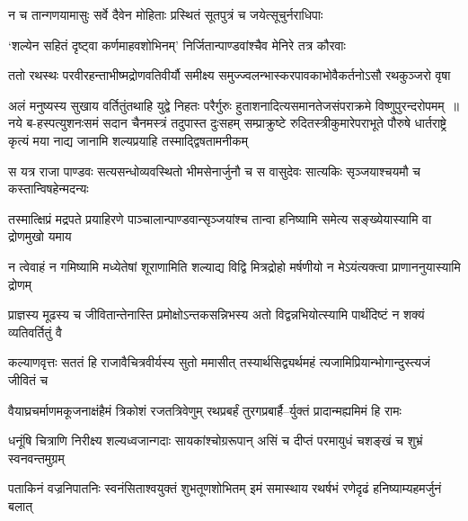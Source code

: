 \twolineshloka
{न च तान्गणयामासुः सर्वे दैवेन मोहिताः}
{प्रस्थितं सूतपुत्रं च जयेत्सूचुर्नराधिपाः}


\twolineshloka
{`शल्येन सहितं दृष्ट्वा कर्णमाहवशोभिनम्'}
{निर्जितान्पाण्डवांश्चैव मेनिरे तत्र कौरवाः}


\twolineshloka
{ततो रथस्थः परवीरहन्ताभीष्मद्रोणवतिवीर्यौ समीक्ष्य}
{समुज्ज्वलन्भास्करपावकाभोवैकर्तनोऽसौ रथकुञ्जरो वृषा}









अलं मनुष्यस्य सुखाय वर्तितुंतथाहि युद्वे निहतः परैर्गुरुः
हुताशनादित्यसमानतेजसंपराक्रमे विष्णुपुरन्दरोपमम् ॥नये ब-हस्पत्युशनःसमं सदान चैनमस्त्रं तदुपास्त दुःसहम्
\twolineshloka
{सम्प्राक्रुष्टे रुदितस्त्रीकुमारेपराभूते पौरुषे धार्तराष्ट्रे}
{कृत्यं मया नाद्य जानामि शल्यप्रयाहि तस्माद्द्विषतामनीकम्}


\twolineshloka
{स यत्र राजा पाण्डवः सत्यसन्धोव्यवस्थितो भीमसेनार्जुनौ च}
{स वासुदेवः सात्यकिः सृञ्जयाश्चयमौ च कस्तान्विषहेन्मदन्यः}


\twolineshloka
{तस्मात्क्षिप्रं मद्रपते प्रयाहिरणे पाञ्चालान्पाण्डवान्सृञ्जयांश्च}
{तान्वा हनिष्यामि समेत्य सङ्ख्येयास्यामि वा द्रोणमुखो यमाय}


\twolineshloka
{न त्वेवाहं न गमिष्यामि मध्येतेषां शूराणामिति शल्याद्य विद्वि}
{मित्रद्रोहो मर्षणीयो न मेऽयंत्यक्त्वा प्राणाननुयास्यामि द्रोणम्}


\twolineshloka
{प्राज्ञस्य मूढस्य च जीवितान्तेनास्ति प्रमोक्षोऽन्तकसन्निभस्य}
{अतो विद्वन्नभियोत्स्यामि पार्थंदिष्टं न शक्यं व्यतिवर्तितुं वै}


\twolineshloka
{कल्याणवृत्तः सततं हि राजावैचित्रवीर्यस्य सुतो ममासीत्}
{तस्यार्थसिद्व्यर्थमहं त्यजामिप्रियान्भोगान्दुस्त्यजं जीवितं च}


\twolineshloka
{वैयाघ्रचर्माणमकूजनाक्षंहैमं त्रिकोशं रजतत्रिवेणुम्}
{रथप्रबर्हं तुरगप्रबार्है--र्युक्तं प्रादान्मह्यमिमं हि रामः}


\twolineshloka
{धनूंषि चित्राणि निरीक्ष्य शल्यध्वजान्गदाः सायकांश्चोग्ररूपान्}
{असिं च दीप्तं परमायुधं चशङ्खं च शुभ्रं स्वनवन्तमुग्रम्}


\twolineshloka
{पताकिनं वज्रनिपातनिः स्वनंसिताश्वयुक्तं शुभतूणशोभितम्}
{इमं समास्थाय रथर्षभं रणेदृढं हनिष्याम्यहमर्जुनं बलात्}


